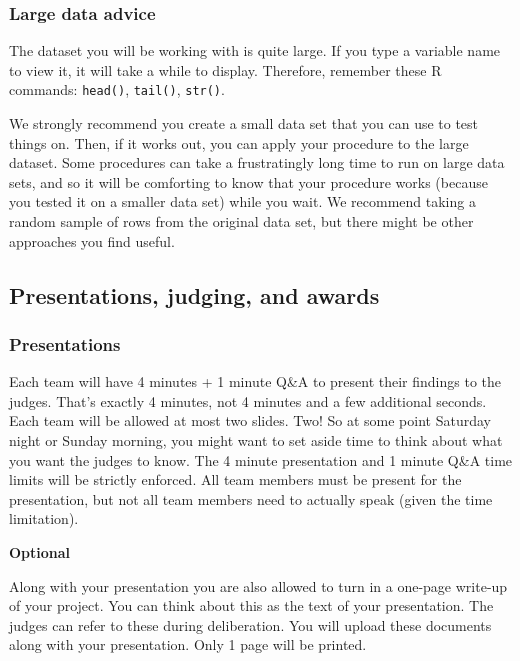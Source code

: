 \documentclass[]{article}
\begin{document}
\hypertarget{large-data-advice}{%
\subsubsection{Large data advice}\label{large-data-advice}}

The dataset you will be working with is quite large. If you type a
variable name to view it, it will take a while to display. Therefore,
remember these R commands: \texttt{head()}, \texttt{tail()},
\texttt{str()}.

We strongly recommend you create a small data set that you can use to
test things on. Then, if it works out, you can apply your procedure to
the large dataset. Some procedures can take a frustratingly long time to
run on large data sets, and so it will be comforting to know that your
procedure works (because you tested it on a smaller data set) while you
wait. We recommend taking a random sample of rows from the original data
set, but there might be other approaches you find useful.

\hypertarget{presentations-judging-and-awards}{%
\subsection{Presentations, judging, and
awards}\label{presentations-judging-and-awards}}

\hypertarget{presentations}{%
\subsubsection{Presentations}\label{presentations}}

Each team will have 4 minutes + 1 minute Q\&A to present their findings
to the judges. That's exactly 4 minutes, not 4 minutes and a few
additional seconds. Each team will be allowed at most two slides. Two!
So at some point Saturday night or Sunday morning, you might want to set
aside time to think about what you want the judges to know. The 4 minute
presentation and 1 minute Q\&A time limits will be strictly enforced.
All team members must be present for the presentation, but not all team
members need to actually speak (given the time limitation).

\textbf{Optional}

Along with your presentation you are also allowed to turn in a one-page
write-up of your project. You can think about this as the text of your
presentation. The judges can refer to these during deliberation. You
will upload these documents along with your presentation. Only 1 page
will be printed.
\end{document}
